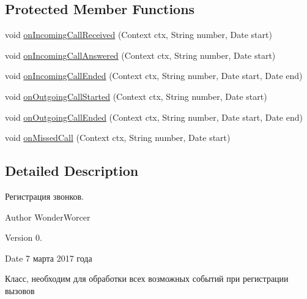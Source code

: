 \subsection*{Protected Member Functions}
\begin{DoxyCompactItemize}
\item 
void \hyperlink{classcom_1_1aykuttasil_1_1callrecord_1_1receiver_1_1_call_record_receiver_a221eff23b7dc251021b576b9340f625c}{on\+Incoming\+Call\+Received} (Context ctx, String number, Date start)
\item 
void \hyperlink{classcom_1_1aykuttasil_1_1callrecord_1_1receiver_1_1_call_record_receiver_ae6124f62a9e2e075c5623c36fab9df0d}{on\+Incoming\+Call\+Answered} (Context ctx, String number, Date start)
\item 
void \hyperlink{classcom_1_1aykuttasil_1_1callrecord_1_1receiver_1_1_call_record_receiver_ac3e3fc614693b39c0d4117fa8ea988ad}{on\+Incoming\+Call\+Ended} (Context ctx, String number, Date start, Date end)
\item 
void \hyperlink{classcom_1_1aykuttasil_1_1callrecord_1_1receiver_1_1_call_record_receiver_a5c093fcfd710179957bc9bf9b52b242c}{on\+Outgoing\+Call\+Started} (Context ctx, String number, Date start)
\item 
void \hyperlink{classcom_1_1aykuttasil_1_1callrecord_1_1receiver_1_1_call_record_receiver_a23ac537f3d22cf22d27b76d2c8b3d2bd}{on\+Outgoing\+Call\+Ended} (Context ctx, String number, Date start, Date end)
\item 
void \hyperlink{classcom_1_1aykuttasil_1_1callrecord_1_1receiver_1_1_call_record_receiver_a602be22f458570452b057d74d5c8b0c6}{on\+Missed\+Call} (Context ctx, String number, Date start)
\end{DoxyCompactItemize}


\subsection{Detailed Description}
Регистрация звонков. 

\begin{DoxyAuthor}{Author}
Wonder\+Worcer 
\end{DoxyAuthor}
\begin{DoxyVersion}{Version}
0. 
\end{DoxyVersion}
\begin{DoxyDate}{Date}
7 марта 2017 года
\end{DoxyDate}
Класс, необходим для обработки всех возможных событий при регистрации вызовов 


